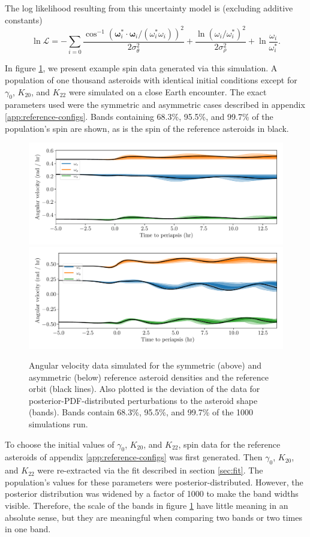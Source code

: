 \documentclass[fleqn,usenatbib]{mnras}
\newcommand{\parens}[1]{\left( #1 \right)}
\begin{document}
The log likelihood resulting from this uncertainty model is (excluding additive constants)
\begin{equation}
  \ln \mathcal{L} = -\sum_{i = 0}\frac{\cos^{-1} (\bm \omega_i^* \cdot \bm \omega_i/(\omega_i^* \omega_i))^2}{2\sigma_\theta^2}+\frac{\ln \parens{\omega_i /\omega_i^*}^2}{2\sigma_\rho^2} + \ln\frac{\omega_i}{\omega_i^*}.
  \label{eqn:log-likelihood}
\end{equation}

In figure \ref{fig:example-data}, we present example spin data generated via this simulation. A population of one thousand asteroids with identical initial conditions except for $\gamma_0$, $K_{20}$, and $K_{22}$ were simulated on a close Earth encounter. The exact parameters used were the symmetric and asymmetric cases described in appendix \ref{app:reference-configs}. Bands containing 68.3\%, 95.5\%, and 99.7\% of the population's spin are shown, as is the spin of the reference asteroids in black.

\begin{figure}
  \centering
  \includegraphics[width=0.7\linewidth]{figs/nominal-data-sym.pdf}
  \includegraphics[width=0.7\linewidth]{figs/nominal-data-asym.pdf}
  \caption{Angular velocity data simulated for the symmetric (above) and asymmetric (below) reference asteroid densities and the reference orbit (black lines). Also plotted is the deviation of the data for posterior-PDF-distributed perturbations to the asteroid shape (bands). Bands contain 68.3\%, 95.5\%, and 99.7\% of the 1000 simulations run.}
  \label{fig:example-data}
\end{figure}

To choose the initial values of $\gamma_0$, $K_{20}$, and $K_{22}$, spin data for the reference asteroids of appendix \ref{app:reference-configs} was first generated. Then $\gamma_0$, $K_{20}$, and $K_{22}$ were re-extracted via the fit described in section \ref{sec:fit}. The population's values for these parameters were posterior-distributed. However, the posterior distribution was widened by a factor of 1000 to make the band widths visible. Therefore, the scale of the bands in figure \ref{fig:example-data} have little meaning in an absolute sense, but they are meaningful when comparing two bands or two times in one band.
\end{document}
